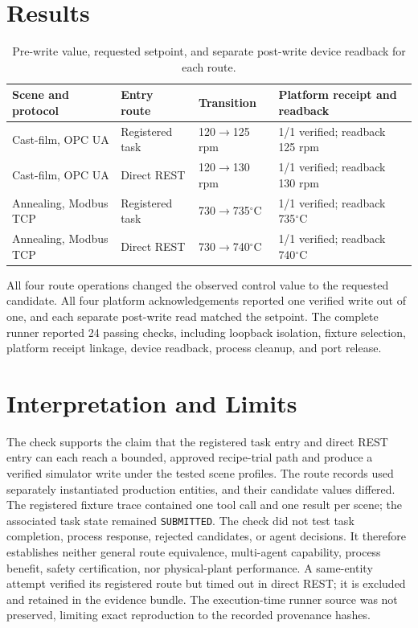 \documentclass[10pt]{article}
\begin{document}
\section{Results}
\begin{table}[ht]
\centering
\caption{Pre-write value, requested setpoint, and separate post-write device
readback for each route.}
\label{tab:s3-results}
\footnotesize
\renewcommand{\arraystretch}{1.12}
\begin{tabularx}{\textwidth}{@{}>{\raggedright\arraybackslash}p{2.1cm}>{\raggedright\arraybackslash}p{2.4cm}X X@{}}
\toprule
Scene and protocol & Entry route & Transition & Platform receipt and readback \\
\midrule
Cast-film, OPC UA & Registered task & 120$\rightarrow$125 rpm & 1/1 verified; readback 125 rpm \\
Cast-film, OPC UA & Direct REST & 120$\rightarrow$130 rpm & 1/1 verified; readback 130 rpm \\
Annealing, Modbus TCP & Registered task & 730$\rightarrow$735$^{\circ}$C & 1/1 verified; readback 735$^{\circ}$C \\
Annealing, Modbus TCP & Direct REST & 730$\rightarrow$740$^{\circ}$C & 1/1 verified; readback 740$^{\circ}$C \\
\bottomrule
\end{tabularx}
\end{table}

All four route operations changed the observed control value to the requested
candidate. All four platform acknowledgements reported one verified write out
of one, and each separate post-write read matched the setpoint. The complete
runner reported 24 passing checks, including loopback isolation, fixture
selection, platform receipt linkage, device readback, process cleanup, and
port release.

\section{Interpretation and Limits}
The check supports the claim that the registered task entry and direct REST
entry can each reach a bounded, approved recipe-trial path and produce a
verified simulator write under the tested scene profiles. The route records
used separately instantiated production entities, and their candidate values
differed. The registered fixture trace contained one tool call and one result
per scene; the associated task state remained \texttt{SUBMITTED}. The check did
not test task completion, process response, rejected candidates, or agent
decisions. It therefore establishes neither general route equivalence,
multi-agent capability, process benefit, safety certification, nor
physical-plant performance. A same-entity attempt verified its registered
route but timed out in direct REST; it is excluded and retained in the
evidence bundle. The execution-time runner source was not preserved, limiting
exact reproduction to the recorded provenance hashes.
\end{document}
